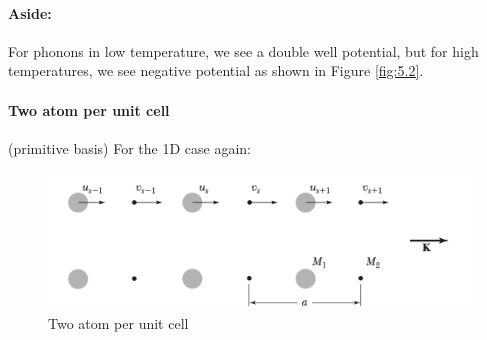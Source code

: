 \documentclass[../main.tex]{subfiles}
\begin{document}
\paragraph{Aside:} For phonons in low temperature, we see a double well potential, but for high
temperatures, we see negative potential as shown in Figure \ref{fig:5.2}. 

\paragraph{Two atom per unit cell} (primitive basis) For the 1D case again:
\begin{figure}[ht]
    \centering
    \includegraphics[width=0.8\linewidth]{2basis.png}
    \caption{Two atom per unit cell}
    \label{fig:5.3}
\end{figure}
\end{document}
